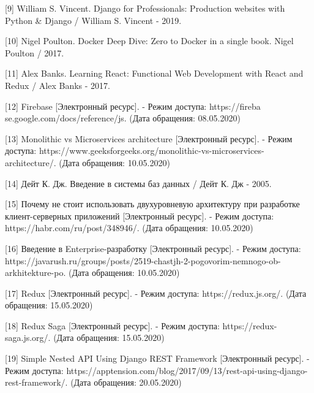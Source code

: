 [9] William S. Vincent. Django for Professionals: Production websites with Python \& Django / William S. Vincent - 2019.

[10] Nigel Poulton. Docker Deep Dive: Zero to Docker in a single book. Nigel Poulton / 2017.


[11] Alex Banks. Learning React: Functional Web Development with React and Redux / Alex Banks - 2017.

[12] Firebase [Электронный ресурс]. - Режим доступа: https://fireba  \linebreak se.google.com/docs/reference/js. (Дата обращения: 08.05.2020)

[13] Monolithic vs Microservices architecture [Электронный ресурс]. - Режим доступа: https://www.geeksforgeeks.org/monolithic-vs-microservices-architecture/. (Дата обращения: 10.05.2020)

[14] Дейт К. Дж. Введение в системы баз данных / Дейт К. Дж - 2005.

[15] Почему не стоит использовать двухуровневую архитектуру при разработке клиент-серверных приложений [Электронный ресурс]. - Режим доступа: https://habr.com/ru/post/348946/. (Дата обращения: 10.05.2020)

[16] Введение в Enterprise-разработку [Электронный ресурс]. - Режим доступа: https://javarush.ru/groups/posts/2519-chastjh-2-pogovorim-nemnogo-ob-arkhitekture-po. (Дата обращения: 10.05.2020)

[17] Redux [Электронный ресурс]. - Режим доступа: https://redux.js.org/. (Дата обращения: 15.05.2020)

[18] Redux Saga [Электронный ресурс]. - Режим доступа: https://redux-saga.js.org/. (Дата обращения: 15.05.2020)

[19] Simple Nested API Using Django REST Framework [Электронный ресурс]. - Режим доступа: https://apptension.com/blog/2017/09/13/rest-api-using-django-rest-framework/. (Дата обращения: 20.05.2020)
